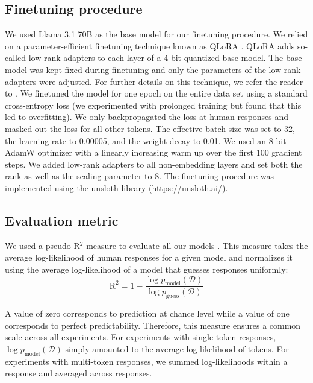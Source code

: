\documentclass[pdflatex,sn-nature]{sn-jnl}%
\theoremstyle{thmstyleone}%
\theoremstyle{thmstyletwo}%
\theoremstyle{thmstylethree}%
\begin{document}
\subsection*{Finetuning procedure}

We used Llama 3.1 70B as the base model for our finetuning procedure. We relied on a parameter-efficient finetuning technique known as QLoRA \cite{dettmers2024qlora}. QLoRA adds so-called low-rank adapters to each layer of a 4-bit quantized base model. The base model was kept fixed during finetuning and only the parameters of the low-rank adapters were adjusted. For further details on this technique, we refer the reader to \cite{dettmers2024qlora}. We finetuned the model for one epoch on the entire data set using a standard cross-entropy loss (we experimented with prolonged training but found that this led to overfitting). We only backpropagated the loss at human responses and masked out the loss for all other tokens. The effective batch size was set to 32, the learning rate to 0.00005, and the weight decay to 0.01. We used an 8-bit AdamW optimizer \cite{loshchilov2019decoupledweightdecayregularization} with a linearly increasing warm up over the first 100 gradient steps. We added low-rank adapters to all non-embedding layers and set both the rank as well as the scaling parameter to 8. The finetuning procedure was implemented using the unsloth library (\url{https://unsloth.ai/}). 

\subsection*{Evaluation metric}

We used a pseudo-R$^2$ measure to evaluate all our models \cite{wu2018generalization}. This measure takes the average log-likelihood of human responses for a given model and normalizes it using the average log-likelihood of a model that guesses responses uniformly:
\begin{equation}
    \text{R}^2 = 1 - \dfrac{\log p_{\text{model}}(\mathcal{D})}{\log p_{\text{guess}}(\mathcal{D})}
\end{equation}

A value of zero corresponds to prediction at chance level while a value of one corresponds to perfect predictability. Therefore, this measure ensures a common scale across all experiments. For experiments with single-token responses, $\log p_{\text{model}}(\mathcal{D})$ simply amounted to the average log-likelihood of tokens. For experiments with multi-token responses, we summed log-likelihoods within a response and averaged across responses.
\end{document}
